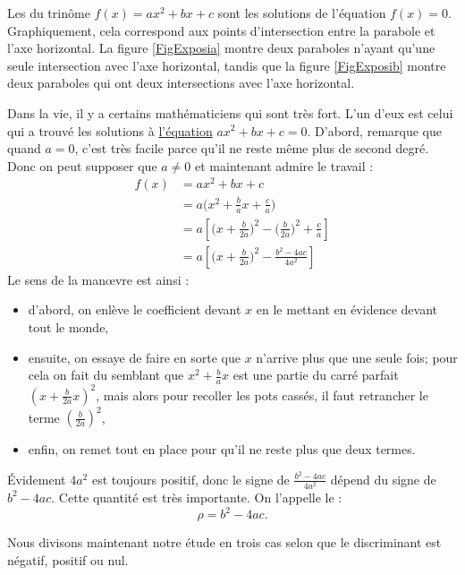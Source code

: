 Les  du trinôme $f(x)=ax^2+bx+c$ sont les solutions de l'équation $f(x)=0$. Graphiquement, cela correspond aux points d'intersection entre la parabole et l'axe horizontal. La figure \ref{FigExposia} montre deux paraboles n'ayant qu'une seule intersection avec l'axe horizontal, tandis que la figure \ref{FigExposib} montre deux paraboles qui ont deux intersections avec l'axe horizontal.


Dans la vie, il y a certains mathématiciens qui sont très fort. L'un d'eux est celui qui a trouvé les solutions à \href{http://fr.wikipedia.org/wiki/Équation_du_second_degré}{l'équation} $ax^2+bx+c=0$. D'abord, remarque que quand $a=0$, c'est très facile parce qu'il ne reste même plus de second degré. Donc on peut supposer que $a\neq 0$ et maintenant admire le travail :
\begin{subequations}
\begin{align}
f(x)	&=ax^2+bx+c\\
	&=a\Big( x^2+\frac{ b }{ a }x+\frac{ c }{ a } \Big)\\
	&=a\left[  \Big( x+\frac{ b }{ 2a } \Big)^2- \Big( \frac{ b }{ 2a } \Big)^2+\frac{ c }{ a }  \right]\\
	&=a\left[ \Big( x+\frac{ b }{ 2a } \Big)^2-\frac{ b^2-4ac }{ 4a^2 } \right]	\label{EqDernmispa}
\end{align}
\end{subequations}
Le sens de la man\oe vre est ainsi :
\begin{itemize}
\item d'abord, on enlève le coefficient devant $x$ en le mettant en évidence devant tout le monde,
\item ensuite, on essaye de faire en sorte que $x$ n'arrive plus que une seule fois; pour cela on fait du semblant que $x^2+\frac{ b }{ a }x$ est une partie du carré parfait $(x+\frac{ b }{ 2a }x)^2$, mais alors pour recoller les pots cassés, il faut retrancher le terme $\left( \frac{ b }{ 2a } \right)^2$,
\item enfin, on remet tout en place pour qu'il ne reste plus que deux termes.
\end{itemize}

Évidement $4a^2$ est toujours positif, donc le signe de $\frac{ b^2-4ac }{ 4a^2 }$ dépend du signe de $b^2-4ac$. Cette quantité est très importante. On l'appelle le  :
\[ 
\rho=b^2-4ac.
\]

Nous divisons maintenant notre étude en trois cas selon que le discriminant est négatif, positif ou nul.

